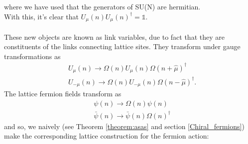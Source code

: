 \documentclass[a4paper,10pt]{book}
\begin{document}
where we have used that the generators of SU(N) are hermitian.\\With this, it's clear that $U_{\mu}(n)U_{\mu}(n)^\dagger = \mathbb{1}$.\\\\
These new objects are known as link variables, due to fact that they are constituents of the links connecting lattice sites. They transform under gauge transformations as 
\begin{equation}\label{eq:linkVariables_transforming}
\begin{aligned}
&U_{\mu}(n) \rightarrow \Omega(n) U_{\mu}(n) \Omega(n+\hat{\mu})^{\dagger}\\
&U_{-\mu}(n) \rightarrow \Omega(n) U_{-\mu}(n) \Omega(n-\hat{\mu})^{\dagger}.
\end{aligned}
\end{equation}
The lattice fermion fields transform as 
\begin{equation}
\begin{aligned}
&\psi(n) \rightarrow \Omega(n) \psi(n)\\ &\bar{\psi}(n) \rightarrow \bar{\psi}(n) \Omega(n)^{\dagger}
\end{aligned}
\end{equation}
and so, we naively (see Theorem \ref{theorem:asas} and section \ref{Chiral_fermions}) make the corresponding lattice construction for the fermion action:
\end{document}
